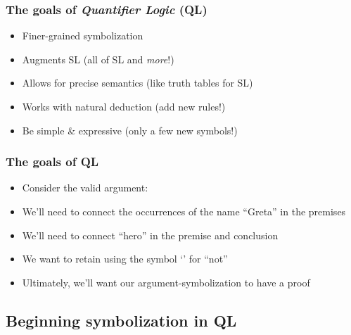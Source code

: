 \begin{frame}
  \frametitle{The goals of \emph{Quantifier Logic} (QL)}
  \begin{itemize}[<+->]
    \item Finer-grained symbolization
    \item Augments SL (all of SL and \textit{more}!)
    \item Allows for precise semantics (like truth tables for SL)
    \item Works with natural deduction (add new rules!)
    \item Be simple \& expressive (only a few new symbols!)
  \end{itemize}
\end{frame}

\begin{frame}
  \frametitle{The goals of QL}

  \begin{itemize}[<+->]
    \item Consider the valid argument:
    \item We'll need to connect the occurrences of the name
    ``Greta'' in the premises
    \item We'll need to connect ``hero'' in the premise and conclusion
    \item We want to retain using the symbol `\enot{}' for ``not''
    \item Ultimately, we'll want our argument-symbolization to have a proof
  \end{itemize}
\end{frame}

\subsection{Beginning symbolization in QL}

